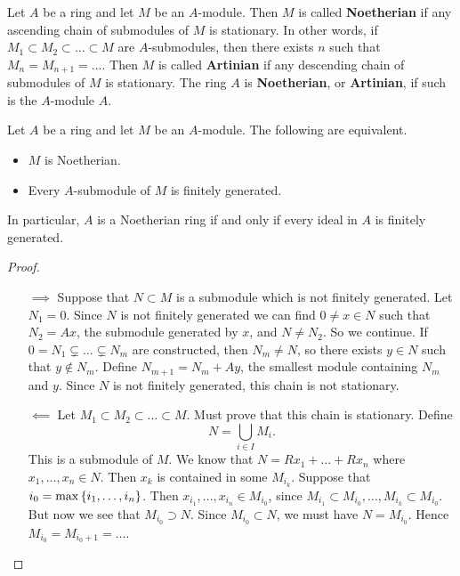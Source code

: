 \begin{definition}
Let $ A $ be a ring and let $ M $ be an $ A $-module. Then $ M $ is called \textbf{Noetherian} if any ascending chain of submodules of $ M $ is stationary. In other words, if $ M_1 \subset M_2 \subset \dots \subset M $ are $ A $-submodules, then there exists $ n $ such that $ M_n = M_{n + 1} = \dots $. Then $ M $ is called \textbf{Artinian} if any descending chain of submodules of $ M $ is stationary. The ring $ A $ is \textbf{Noetherian}, or \textbf{Artinian}, if such is the $ A $-module $ A $.
\end{definition}

\begin{proposition}
Let $ A $ be a ring and let $ M $ be an $ A $-module. The following are equivalent.
\begin{itemize}
\item $ M $ is Noetherian.
\item Every $ A $-submodule of $ M $ is finitely generated.
\end{itemize}
In particular, $ A $ is a Noetherian ring if and only if every ideal in $ A $ is finitely generated.
\end{proposition}

\begin{proof}
\hfill
\begin{itemize}
\item[$ \implies $] Suppose that $ N \subset M $ is a submodule which is not finitely generated. Let $ N_1 = 0 $. Since $ N $ is not finitely generated we can find $ 0 \ne x \in N $ such that $ N_2 = Ax $, the submodule generated by $ x $, and $ N \ne N_2 $. So we continue. If $ 0 = N_1 \subsetneq \dots \subsetneq N_m $ are constructed, then $ N_m \ne N $, so there exists $ y \in N $ such that $ y \notin N_m $. Define $ N_{m + 1} = N_m + Ay $, the smallest module containing $ N_m $ and $ y $. Since $ N $ is not finitely generated, this chain is not stationary.
\item[$ \impliedby $] Let $ M_1 \subset M_2 \subset \dots \subset M $. Must prove that this chain is stationary. Define
$$ N = \bigcup_{i \in I} M_i. $$
This is a submodule of $ M $. We know that $ N = Rx_1 + \dots + Rx_n $ where $ x_1, \dots, x_n \in N $. Then $ x_k $ is contained in some $ M_{i_k} $. Suppose that $ i_0 = \max\cbr{i_1, \dots, i_n} $. Then $ x_{i_1}, \dots, x_{i_n} \in M_{i_0} $, since $ M_{i_1} \subset M_{i_0}, \dots, M_{i_k} \subset M_{i_0} $. But now we see that $ M_{i_0} \supset N $. Since $ M_{i_0} \subset N $, we must have $ N = M_{i_0} $. Hence $ M_{i_0} = M_{i_0 + 1} = \dots $.
\end{itemize}
\end{proof}

